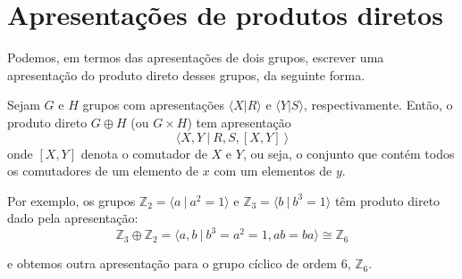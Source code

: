 	\section{Apresentações de produtos diretos}
	\hspace{12pt} Podemos, em termos das apresentações de dois grupos, escrever uma apresentação do produto direto desses grupos, da seguinte forma.
	\begin{prop}
	\label{apresentacao prod direto}
	Sejam $G$ e $H$ grupos com apresentações $\langle X|R \rangle$ e $\langle Y|S \rangle$, respectivamente. Então, o produto direto $G\oplus H$ (ou $G\times H$) tem apresentação
	$$ \langle X,Y \ | \ R,S, [X,Y] \ \rangle $$
	onde $[X,Y]$ denota o comutador de $X$ e $Y$, ou seja, o conjunto que contém todos os comutadores de um elemento de $x$ com um elementos de $y$.
	\end{prop}
	\par\vspace{0.3cm} Por exemplo, os grupos $\mathbb{Z}_2 = \langle a\ | \ a^2=1 \rangle$ e $\mathbb{Z}_3 = \langle b\ | \ b^3=1 \rangle$ têm produto direto dado pela apresentação:
	\begin{equation*}
	\mathbb{Z}_3\oplus\mathbb{Z}_2 = \langle a,b \ | \ b^3=a^2=1, ab = ba \rangle \cong \mathbb{Z}_6 
	\end{equation*}
	\par\vspace{0.3cm} e obtemos outra apresentação para o grupo cíclico de ordem $6$, $\mathbb{Z}_6$.
	
	
